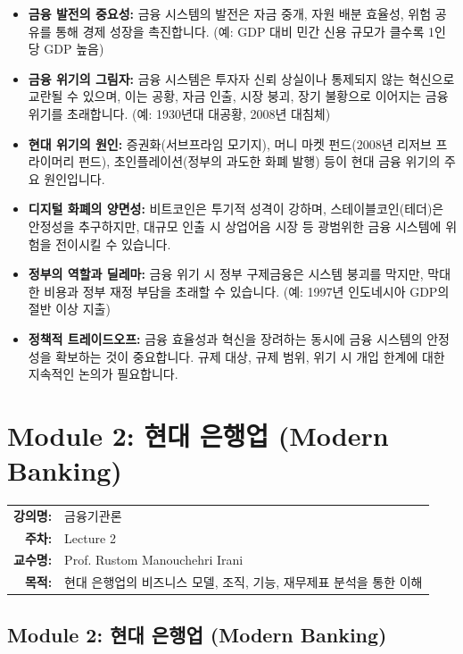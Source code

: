 \documentclass[11pt,a4paper]{book}
\makeatletter
\theoremstyle{definition}
\newcommand{\metainfo}[4]{
\begin{tcolorbox}[
    colback=lightpurple,
    colframe=darkpurple,
    boxrule=1pt,
    arc=2mm,
    left=10pt,
    right=10pt,
    top=8pt,
    bottom=8pt
]
\begin{tabular}{@{}rl@{}}
\textbf{강의명:} & #1 \\[0.3em]
\textbf{주차:} & #2 \\[0.3em]
\textbf{교수명:} & #3 \\[0.3em]
\textbf{목적:} & \begin{minipage}[t]{0.75\textwidth}#4\end{minipage}
\end{tabular}
\end{tcolorbox}
}
\makeatother
\begin{document}
\begin{tcolorbox}[title={\textbf{빠르게 훑어보기: Module 1 핵심 요약}}]
\begin{itemize}
    \item \textbf{금융 발전의 중요성:} 금융 시스템의 발전은 자금 중개, 자원 배분 효율성, 위험 공유를 통해 경제 성장을 촉진합니다. (예: GDP 대비 민간 신용 규모가 클수록 1인당 GDP 높음)
    \item \textbf{금융 위기의 그림자:} 금융 시스템은 투자자 신뢰 상실이나 통제되지 않는 혁신으로 교란될 수 있으며, 이는 공황, 자금 인출, 시장 붕괴, 장기 불황으로 이어지는 금융 위기를 초래합니다. (예: 1930년대 대공황, 2008년 대침체)
    \item \textbf{현대 위기의 원인:} 증권화(서브프라임 모기지), 머니 마켓 펀드(2008년 리저브 프라이머리 펀드), 초인플레이션(정부의 과도한 화폐 발행) 등이 현대 금융 위기의 주요 원인입니다.
    \item \textbf{디지털 화폐의 양면성:} 비트코인은 투기적 성격이 강하며, 스테이블코인(테더)은 안정성을 추구하지만, 대규모 인출 시 상업어음 시장 등 광범위한 금융 시스템에 위험을 전이시킬 수 있습니다.
    \item \textbf{정부의 역할과 딜레마:} 금융 위기 시 정부 구제금융은 시스템 붕괴를 막지만, 막대한 비용과 정부 재정 부담을 초래할 수 있습니다. (예: 1997년 인도네시아 GDP의 절반 이상 지출)
    \item \textbf{정책적 트레이드오프:} 금융 효율성과 혁신을 장려하는 동시에 금융 시스템의 안정성을 확보하는 것이 중요합니다. 규제 대상, 규제 범위, 위기 시 개입 한계에 대한 지속적인 논의가 필요합니다.
\end{itemize}
\end{tcolorbox}


\chapter{Module 2: 현대 은행업 (Modern Banking)}
\label{ch:module2}

\metainfo{금융기관론}{Lecture 2}{Prof. Rustom Manouchehri Irani}{현대 은행업의 비즈니스 모델, 조직, 기능, 재무제표 분석을 통한 이해}


\section{Module 2: 현대 은행업 (Modern Banking)}
\end{document}
